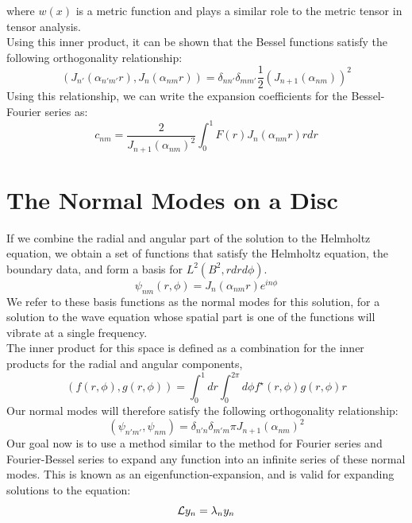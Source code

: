 \documentclass{article}
\begin{document}
where $w(x)$ is a metric function and plays a similar role to the metric tensor in tensor analysis.\\
Using this inner product, it can be shown that the Bessel functions satisfy the following orthogonality relationship:
\begin{equation}
  \boxed{
    \left(J_{n'}(\alpha_{n'm'}r),J_{n}(\alpha_{nm}r)\right) =\delta_{nn'}\delta_{mm'}\frac{1}{2}(J_{n+1}(\alpha_{nm}))^2
  }
\end{equation}
Using this relationship, we can write the expansion coefficients for the Bessel-Fourier series as:
\begin{equation}
  \boxed{
    c_{nm} = \frac{2}{J_{n+1}(\alpha_{nm})^2}\int_0^1 F(r)J_n(\alpha_{nm}r) rdr
  }
\end{equation}
\section{The Normal Modes on a Disc}
If we combine the radial and angular part of the solution to the Helmholtz equation, we obtain a set of functions that satisfy the Helmholtz equation, the boundary data, and form a basis for $L^2(B^2,rdrd\phi)$. 
\begin{equation}
  \boxed{
    \psi_{nm}(r,\phi) = J_n ( \alpha_{nm} r) e^{i n \phi}
  }
\end{equation}
We refer to these basis functions as the normal modes for this solution, for a solution to the wave equation whose spatial part is one of the functions will vibrate at a single frequency.\\
The inner product for this space is defined as a combination for the inner products for the radial and angular components,
\begin{equation}
  \boxed{
    \left(f(r,\phi),g(r,\phi)\right) = \int_0 ^1 dr \int_0 ^{2\pi} d\phi f^\star(r,\phi) g(r,\phi) r
  }
\end{equation}
Our normal modes will therefore satisfy the following orthogonality relationship:
\begin{equation}
  (\psi_{n'm'},\psi_{nm}) = \delta_{n'n}\delta_{m'm} \pi J_{n+1}( \alpha_{nm } )^2
\end{equation}
Our goal now is to use a method similar to the method for Fourier series and Fourier-Bessel series to expand any function into an infinite series of these normal modes. This is known as an eigenfunction-expansion, and is valid for expanding solutions to the equation:
\begin{equation}
  \mathcal{L} y_n = \lambda_n y_n
\end{equation}
\end{document}
